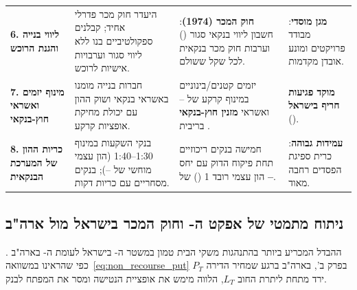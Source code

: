 \begin{table}[htbp]
\begin{tabularx}{\textwidth}{R{2.3cm} Y Y R{2.1cm}}
\textbf{6. ליווי בנייה והגנת הרוכש} & היעדר חוק מכר פדרלי אחיד; קבלנים ספקולטיביים בנו ללא ליווי סגור וערבויות אישיות לרוכש. & \textbf{חוק המכר (\num{1974})}: חשבון ליווי בנקאי סגור () וערבות חוק מכר בנקאית לכל שקל ששולם. & \textbf{\color{BrandTeal}מגן מוסדי}: מבודד פרויקטים ומונע אובדן מקדמות. \\
\textbf{7. מינוף יזמים ואשראי חוץ-בנקאי} & חברות בנייה מומנו באשראי בנקאי ושוק ההון עם יכולת מחיקת אופציות קרקע. & יזמים קטנים/בינוניים במינוף קרקע של -- ואשראי \textbf{מזנין חוץ-בנקאי} בריבית . & \textbf{\color{BrandRed}מוקד פגיעות חריף בישראל} (). \\
\textbf{8. כריות ההון של המערכת הבנקאית} & בנקי השקעות במינוף \num{1:30}--\num{1:40} (הון עצמי מוחשי של --); בנקים מסחריים עם כריות דקות. & חמישה בנקים ריכוזיים תחת פיקוח הדוק עם יחס הון עצמי רובד \num{1} (\textbf{}) של \textbf{--}. & \textbf{\color{BrandTeal}עמידות גבוהה}: כרית ספיגת הפסדים רחבה מאוד. \\
\bottomrule
\end{tabularx}
\end{table}

\subsection{ניתוח מתמטי של אפקט ה- וחוק המכר בישראל מול ארה"ב}
ההבדל המכריע ביותר בהתנהגות משקי הבית טמון במשטר ה- בישראל לעומת ה- בארה"ב \cite{ghent2011recourse}. כפי שהראינו במשוואה~\eqref{eq:non_recourse_put} בפרק ב', בארה"ב ברגע שמחיר הדירה $P_T$ ירד מתחת ליתרת החוב $L_T$, הלווה מימש את אופציית הנטישה ומסר את המפתח לבנק.

